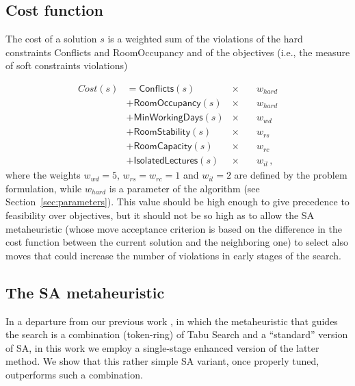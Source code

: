 \documentclass[authoryear,12pt]{article}
\begin{document}
\subsection{Cost function} \label{sec:cost}
The cost of a solution $s$ is a weighted sum of the violations of the hard
constraints \textsf{Conflicts} and \textsf{RoomOccupancy} and of the objectives
(i.e., the measure of soft constraints violations)

\begin{align}
    \label{eqn:cost}
    Cost(s) & = \mathsf{Conflicts}(s) & \times\quad & w_{hard} \nonumber \\
            & + \mathsf{RoomOccupancy}(s) & \times\quad &  w_{hard} \nonumber \\
            & + \mathsf{MinWorkingDays}(s) & \times\quad &  w_{wd} \nonumber \\
            & + \mathsf{RoomStability}(s) & \times\quad & w_{rs} \nonumber \\
            & + \mathsf{RoomCapacity}(s) & \times\quad & w_{rc} \nonumber \\
            & + \mathsf{IsolatedLectures}(s) & \times\quad &  w_{il} \nonumber \, ,
\end{align}
%
where the weights $w_{wd} = 5$, $w_{rs} = w_{rc} = 1$ and $w_{il} = 2$ are
defined by the problem formulation, while $w_{hard}$ is a parameter of the
algorithm (see Section~\ref{sec:parameters}). This value should be high enough
to give precedence to feasibility over objectives, but it should not be so high
as to allow the SA metaheuristic (whose move acceptance criterion is based on
the difference in the cost function between the current solution and the
neighboring one) to select also moves that could increase the number of
violations in early stages of the search.

\subsection{The SA metaheuristic} \label{sec:metaheuristic}

In a departure from our previous work \citep{BeDS12}, in which the metaheuristic
that guides the search is a combination (token-ring) of Tabu Search and a
``standard'' version of SA, in this work we employ a single-stage enhanced
version of the latter method.  We show that this rather simple SA variant, once
properly tuned, outperforms such a combination.
\end{document}
